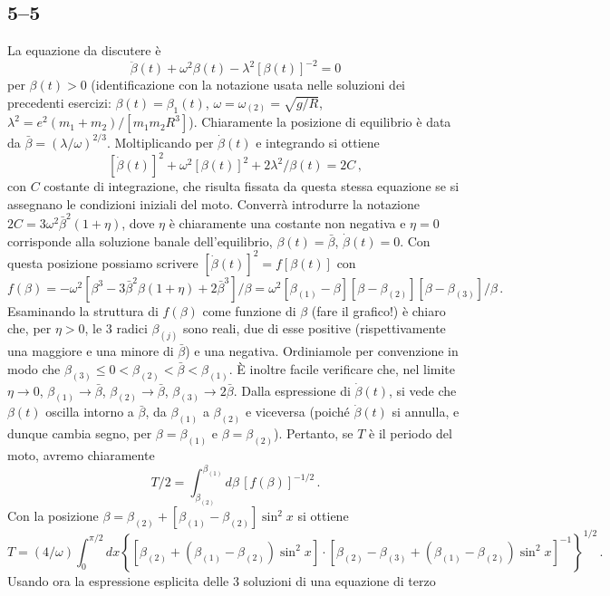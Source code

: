 \documentclass[11pt, a4paper]{book}
\numberwithin{equation}{section}
\begin{document}
\subsection*{5--5}
La equazione da discutere è
\[
    \ddot{\beta}(t) + \omega^2\beta(t) - \lambda^2[\beta(t)]^{-2} = 0
\]
per $\beta(t)>0$ (identificazione con la notazione usata nelle soluzioni dei
precedenti esercizi: $\beta(t)=\beta_1(t)$, $\omega=\omega_{(2)}=\sqrt{g/R}$,
$\lambda^2=e^2(m_1+m_2)/[m_1m_2 R^3]$). Chiaramente la posizione di equilibrio è
data da $\bar{\beta}=(\lambda/\omega)^{2/3}$.
Moltiplicando per $\dot{\beta}(t)$ e integrando si ottiene
\[
    [\dot{\beta}(t)]^2 + \omega^2[\beta(t)]^2 + 2\lambda^2/\beta(t) = 2C\,,
\]
con $C$ costante di integrazione, che risulta fissata da questa stessa equazione
se si assegnano le condizioni iniziali del moto. Converrà introdurre la
notazione $2C = 3\omega^2\bar{\beta}^2(1+\eta)$, dove $\eta$ è chiaramente una
costante non negativa e $\eta=0$ corrisponde alla soluzione banale
dell'equilibrio, $\beta(t)=\bar{\beta}$, $\dot{\beta}(t)=0$. Con questa posizione
possiamo scrivere $[\dot{\beta}(t)]^2 = f[\beta(t)]$ con
\[
    f(\beta) = -\omega^2\left[\beta^3 - 3\bar{\beta}^2\beta(1+\eta) + 2\bar{\beta}^3\right]/\beta
    = \omega^2[\beta_{(1)}-\beta][\beta-\beta_{(2)}][\beta-\beta_{(3)}]/\beta \,.
\]
Esaminando la struttura di $f(\beta)$ come funzione di $\beta$ (fare il grafico!)
è chiaro che, per $\eta>0$, le 3 radici $\beta_{(j)}$ sono reali, due di esse
positive (rispettivamente una maggiore e una minore di $\bar{\beta}$) e una
negativa. Ordiniamole per convenzione in modo che
$\beta_{(3)} \leq 0 < \beta_{(2)} < \bar{\beta} < \beta_{(1)}$.
È inoltre facile verificare che, nel limite $\eta\to 0$, $\beta_{(1)}\to\bar{\beta}$,
$\beta_{(2)}\to\bar{\beta}$, $\beta_{(3)}\to 2\bar{\beta}$. %
Dalla espressione di $\dot{\beta}(t)$, si vede che $\beta(t)$ oscilla intorno a
$\bar{\beta}$, da $\beta_{(1)}$ a $\beta_{(2)}$ e viceversa (poiché $\dot{\beta}(t)$ si
annulla, e dunque cambia segno, per $\beta=\beta_{(1)}$ e $\beta=\beta_{(2)}$).
Pertanto, se $T$ è il periodo del moto, avremo chiaramente
\[
    T/2 = \int_{\beta_{(2)}}^{\beta_{(1)}} d\beta \, [f(\beta)]^{-1/2} \,.
\]
Con la posizione $\beta = \beta_{(2)} + [\beta_{(1)}-\beta_{(2)}]\sin^2 x$ si ottiene
\[
    T = (4/\omega)\int_0^{\pi/2} dx \left\{
    [\beta_{(2)} + (\beta_{(1)}-\beta_{(2)})\sin^2 x] \cdot
    [\beta_{(2)} - \beta_{(3)} + (\beta_{(1)}-\beta_{(2)})\sin^2 x]^{-1}
    \right\}^{1/2} \,.
\]
Usando ora la espressione esplicita delle 3 soluzioni di una equazione di terzo
\end{document}
